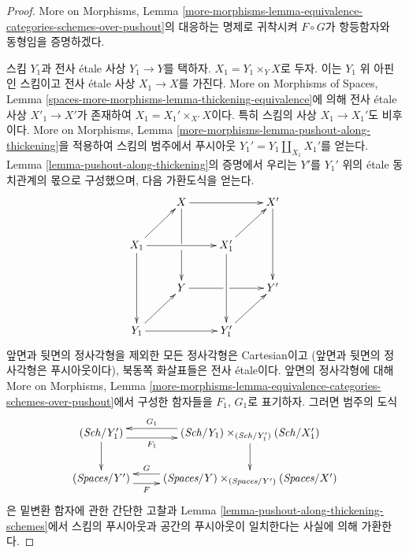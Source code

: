 \begin{proof}
More on Morphisms, Lemma
\ref{more-morphisms-lemma-equivalence-categories-schemes-over-pushout}의
대응하는 명제로 귀착시켜 $F \circ G$가 항등함자와 동형임을 증명하겠다.

\medskip\noindent
스킴 $Y_1$과 전사 \'etale 사상 $Y_1 \to Y$를 택하자.
$X_1 = Y_1 \times_Y X$로 두자. 이는 $Y_1$ 위 아핀인 스킴이고
전사 \'etale 사상 $X_1 \to X$를 가진다.
More on Morphisms of Spaces, Lemma
\ref{spaces-more-morphisms-lemma-thickening-equivalence}에 의해
전사 \'etale 사상 $X'_1 \to X'$가 존재하여
$X_1 = X_1' \times_{X'} X$이다. 특히 스킴의 사상
$X_1 \to X_1'$도 비후이다. More on Morphisms, Lemma
\ref{more-morphisms-lemma-pushout-along-thickening}을 적용하여
스킴의 범주에서 푸시아웃
$Y_1' = Y_1 \amalg_{X_1} X_1'$를 얻는다.
Lemma \ref{lemma-pushout-along-thickening}의 증명에서 우리는
$Y'$를 $Y_1'$ 위의 \'etale 동치관계의 몫으로 구성했으며,
다음 가환도식을 얻는다.
\begin{equation}
\label{equation-cube}
\vcenter{
\xymatrix{
& X \ar[rr] \ar'[d][dd] & & X' \ar[dd] \\
X_1 \ar[rr] \ar[dd] \ar[ru] & & X_1' \ar[dd] \ar[ru] & \\
& Y \ar'[r][rr] & & Y' \\
Y_1 \ar[rr] \ar[ru] & & Y_1' \ar[ru]
}
}
\end{equation}
앞면과 뒷면의 정사각형을 제외한 모든 정사각형은 Cartesian이고
(앞면과 뒷면의 정사각형은 푸시아웃이다), 북동쪽 화살표들은
전사 \'etale이다. 앞면의 정사각형에 대해 More on Morphisms, Lemma
\ref{more-morphisms-lemma-equivalence-categories-schemes-over-pushout}에서
구성한 함자들을 $F_1$, $G_1$로 표기하자. 그러면 범주의 도식
$$
\xymatrix{
(\Sch/Y_1') \ar@<-1ex>[r]_-{F_1} \ar[d] &
(\Sch/Y_1) \times_{(\Sch/Y_1')} (\Sch/X_1') \ar[d] \ar@<-1ex>[l]_-{G_1} \\
(\textit{Spaces}/Y') \ar@<-1ex>[r]_-F &
(\textit{Spaces}/Y) \times_{(\textit{Spaces}/Y')} (\textit{Spaces}/X')
\ar@<-1ex>[l]_-G
}
$$
은 밑변환 함자에 관한 간단한 고찰과 Lemma
\ref{lemma-pushout-along-thickening-schemes}에서 스킴의 푸시아웃과
공간의 푸시아웃이 일치한다는 사실에 의해 가환한다.


\end{proof}
